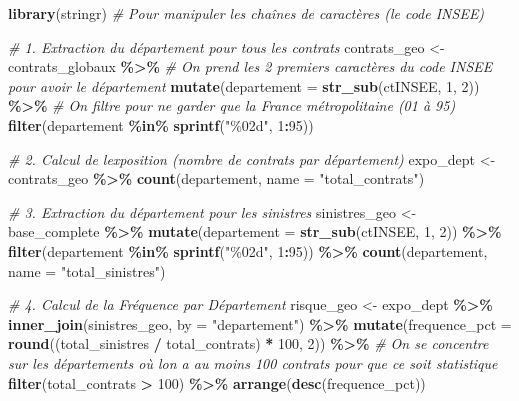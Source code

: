 \documentclass[
]{article}
\newenvironment{Shaded}{\begin{snugshade}}{\end{snugshade}}
\newcommand{\AttributeTok}[1]{\textcolor[rgb]{0.13,0.29,0.53}{#1}}
\newcommand{\CommentTok}[1]{\textcolor[rgb]{0.56,0.35,0.01}{\textit{#1}}}
\newcommand{\DecValTok}[1]{\textcolor[rgb]{0.00,0.00,0.81}{#1}}
\newcommand{\FunctionTok}[1]{\textcolor[rgb]{0.13,0.29,0.53}{\textbf{#1}}}
\newcommand{\NormalTok}[1]{#1}
\newcommand{\OtherTok}[1]{\textcolor[rgb]{0.56,0.35,0.01}{#1}}
\newcommand{\SpecialCharTok}[1]{\textcolor[rgb]{0.81,0.36,0.00}{\textbf{#1}}}
\newcommand{\StringTok}[1]{\textcolor[rgb]{0.31,0.60,0.02}{#1}}
\begin{document}
\begin{Shaded}
\begin{Highlighting}[]
\FunctionTok{library}\NormalTok{(stringr) }\CommentTok{\# Pour manipuler les chaînes de caractères (le code INSEE)}

\CommentTok{\# 1. Extraction du département pour tous les contrats}
\NormalTok{contrats\_geo }\OtherTok{\textless{}{-}}\NormalTok{ contrats\_globaux }\SpecialCharTok{\%\textgreater{}\%}
  \CommentTok{\# On prend les 2 premiers caractères du code INSEE pour avoir le département}
  \FunctionTok{mutate}\NormalTok{(}\AttributeTok{departement =} \FunctionTok{str\_sub}\NormalTok{(ctINSEE, }\DecValTok{1}\NormalTok{, }\DecValTok{2}\NormalTok{)) }\SpecialCharTok{\%\textgreater{}\%}
  \CommentTok{\# On filtre pour ne garder que la France métropolitaine (01 à 95)}
  \FunctionTok{filter}\NormalTok{(departement }\SpecialCharTok{\%in\%} \FunctionTok{sprintf}\NormalTok{(}\StringTok{"\%02d"}\NormalTok{, }\DecValTok{1}\SpecialCharTok{:}\DecValTok{95}\NormalTok{))}

\CommentTok{\# 2. Calcul de l\textquotesingle{}exposition (nombre de contrats par département)}
\NormalTok{expo\_dept }\OtherTok{\textless{}{-}}\NormalTok{ contrats\_geo }\SpecialCharTok{\%\textgreater{}\%}
  \FunctionTok{count}\NormalTok{(departement, }\AttributeTok{name =} \StringTok{"total\_contrats"}\NormalTok{)}

\CommentTok{\# 3. Extraction du département pour les sinistres}
\NormalTok{sinistres\_geo }\OtherTok{\textless{}{-}}\NormalTok{ base\_complete }\SpecialCharTok{\%\textgreater{}\%}
  \FunctionTok{mutate}\NormalTok{(}\AttributeTok{departement =} \FunctionTok{str\_sub}\NormalTok{(ctINSEE, }\DecValTok{1}\NormalTok{, }\DecValTok{2}\NormalTok{)) }\SpecialCharTok{\%\textgreater{}\%}
  \FunctionTok{filter}\NormalTok{(departement }\SpecialCharTok{\%in\%} \FunctionTok{sprintf}\NormalTok{(}\StringTok{"\%02d"}\NormalTok{, }\DecValTok{1}\SpecialCharTok{:}\DecValTok{95}\NormalTok{)) }\SpecialCharTok{\%\textgreater{}\%}
  \FunctionTok{count}\NormalTok{(departement, }\AttributeTok{name =} \StringTok{"total\_sinistres"}\NormalTok{)}

\CommentTok{\# 4. Calcul de la Fréquence par Département}
\NormalTok{risque\_geo }\OtherTok{\textless{}{-}}\NormalTok{ expo\_dept }\SpecialCharTok{\%\textgreater{}\%}
  \FunctionTok{inner\_join}\NormalTok{(sinistres\_geo, }\AttributeTok{by =} \StringTok{"departement"}\NormalTok{) }\SpecialCharTok{\%\textgreater{}\%}
  \FunctionTok{mutate}\NormalTok{(}\AttributeTok{frequence\_pct =} \FunctionTok{round}\NormalTok{((total\_sinistres }\SpecialCharTok{/}\NormalTok{ total\_contrats) }\SpecialCharTok{*} \DecValTok{100}\NormalTok{, }\DecValTok{2}\NormalTok{)) }\SpecialCharTok{\%\textgreater{}\%}
  \CommentTok{\# On se concentre sur les départements où l\textquotesingle{}on a au moins 100 contrats pour que ce soit statistique}
  \FunctionTok{filter}\NormalTok{(total\_contrats }\SpecialCharTok{\textgreater{}} \DecValTok{100}\NormalTok{) }\SpecialCharTok{\%\textgreater{}\%}
  \FunctionTok{arrange}\NormalTok{(}\FunctionTok{desc}\NormalTok{(frequence\_pct))}


\end{Highlighting}
\end{Shaded}
\end{document}
